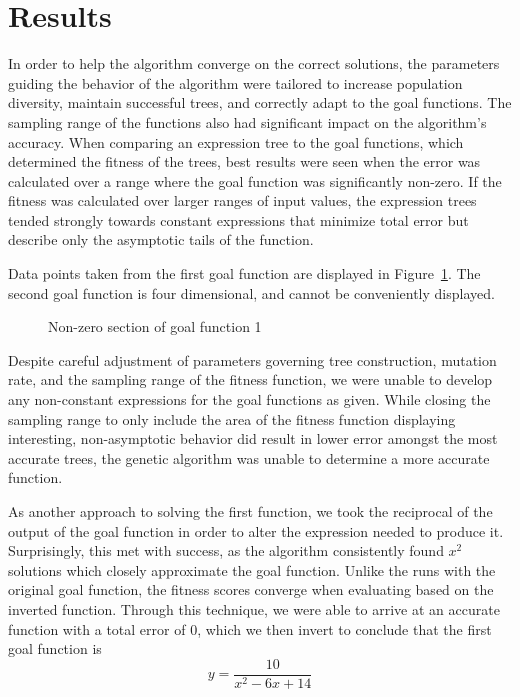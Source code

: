 
\section{Results}
\label{sec:results}

In order to help the algorithm converge on the correct solutions, the parameters guiding the behavior of the algorithm were tailored to increase population diversity, maintain successful trees, and correctly adapt to the goal functions.  The sampling range of the functions also had significant impact on the algorithm's accuracy.  When comparing an expression tree to the goal functions, which determined the fitness of the trees, best results were seen when the error was calculated over a range where the goal function was significantly non-zero.  If the fitness was calculated over larger ranges of input values, the expression trees tended strongly towards constant expressions that minimize total error but describe only the asymptotic tails of the function.  

Data points taken from the first goal function are displayed in Figure~\ref{tab:fcn1}.  The second goal function is four dimensional, and cannot be conveniently displayed.

\begin{figure}
\centering
\caption{Non-zero section of goal function 1}
\label{tab:fcn1}
\end{figure}

Despite careful adjustment of parameters governing tree construction, mutation rate, and the sampling range of the fitness function, we were unable to develop any non-constant expressions for the goal functions as given.  While closing the sampling range to only include the area of the fitness function displaying interesting, non-asymptotic behavior did result in lower error amongst the most accurate trees, the genetic algorithm was unable to determine a more accurate function.  

As another approach to solving the first function, we took the reciprocal of the output of the goal function in order to alter the expression needed to produce it.  Surprisingly, this met with success, as the algorithm consistently found $x^2$ solutions which closely approximate the goal function.  Unlike the runs with the original goal function, the fitness scores converge when evaluating based on the inverted function.  Through this technique, we were able to arrive at an accurate function with a total error of $0$, which we then invert to conclude that the first goal function is 
	$$ y = \frac{10}{x^2- 6x + 14} $$

